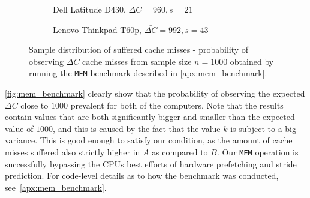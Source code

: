 \begin{figure}[ht]
    \begin{subfigure}{0.5\textwidth}
        \centering
        \caption{Dell Latitude D430, $\bar{\Delta C} = 960, s=21$ }
    \end{subfigure}
    \begin{subfigure}{0.5\textwidth}
        \centering
        \caption{Lenovo Thinkpad T60p, $\bar{\Delta C} = 992, s=43$ }
    \end{subfigure}
    \caption{Sample distribution of suffered cache misses - probability of observing \(\Delta C\) cache misses from sample size $n=1000$ obtained by running the \texttt{MEM} benchmark described in \autoref{apx:mem_benchmark}.}
    \label{fig:mem_benchmark}
\end{figure}

\autoref{fig:mem_benchmark} clearly show that the probability of observing the expected \(\Delta C\) close to \(1000\) prevalent for both of the computers.
Note that the results contain values that are both significantly bigger and smaller than the expected value of \(1000\), and this is caused by the fact that the value \(k\) is subject to a big variance.
This is good enough to satisfy our condition, as the amount of cache misses suffered also strictly higher in \(A\) as compared to \(B\).
Our \texttt{MEM} operation is successfully bypassing the \gls{CPU}s best efforts of hardware prefetching and stride prediction.
For code-level details as to how the benchmark was conducted, see~\autoref{apx:mem_benchmark}.


